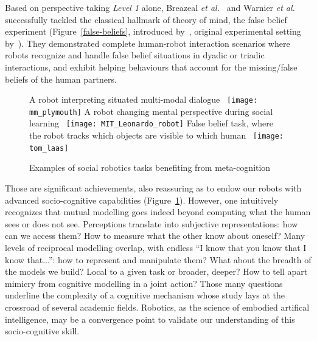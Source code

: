 \documentclass{sig-alternate}
\newcommand{\etal}{{\textit{et al.~}}}
\begin{document}
Based on perspective taking \emph{Level 1} alone, Breazeal
\etal\cite{breazeal2009embodied} and Warnier \etal\cite{warnier2012when}
successfully tackled the classical hallmark of theory of mind, the false belief
experiment (Figure~\ref{false-beliefs}, introduced by~\cite{wimmer1983beliefs},
original experimental setting by~\cite{baron1985does}). They demonstrated
complete human-robot interaction scenarios where robots recognize and handle
false belief situations in dyadic or triadic interactions, and exhibit helping
behaviours that account for the missing/false beliefs of the human partners.

\begin{figure}[htb]
\centering
\subcaptionbox
    {\small A robot interpreting situated multi-modal dialogue~\cite{belpaeme2012multimodal}}
    {\texttt{[image: mm\_plymouth]}}
\hspace{0.5cm}
\subcaptionbox
    {\small A robot changing mental perspective during social learning~\cite{breazeal2009embodied}}
    {\texttt{[image: MIT\_Leonardo\_robot]}}
\hspace{0.5cm}
\subcaptionbox
    {\small False belief task, where the robot tracks which objects are visible
    to which human~\cite{warnier2012when}}
    {\texttt{[image: tom\_laas]}}
\caption{\small Examples of social robotics tasks benefiting from meta-cognition}

\label{fig:mm_robotics}
\end{figure}

Those are significant achievements, also reassuring as to endow our robots with
advanced socio-cognitive capabilities (Figure~\ref{fig:mm_robotics}).  However,
one intuitively recognizes that mutual modelling goes indeed beyond computing
what the human sees or does not see. Perceptions translate into subjective
representations: how can we access them? How to measure what the other know
about oneself? Many levels of reciprocal modelling overlap, with endless ``I
know that you know that I know that...'': how to represent and manipulate them?
What about the breadth of the models we build?  Local to a given task or
broader, deeper? How to tell apart mimicry from cognitive modelling in a joint
action?  Those many questions underline the complexity of a cognitive mechanism
whose study lays at the crossroad of several academic fields. Robotics, as the
science of embodied artifical intelligence, may be a convergence point to
validate our understanding of this socio-cognitive skill.
\end{document}
